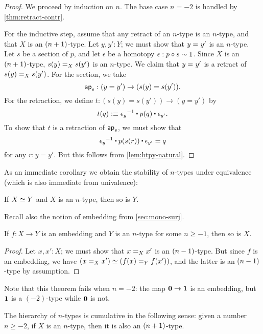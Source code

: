 \begin{proof}
 We proceed by induction on $n$.
 The base case $n=-2$ is handled by \autoref{thm:retract-contr}.

 For the inductive step, assume that any retract of an $n$-type is an $n$-type, and that $X$ is an $\nplusone$-type.
 Let $y, y' : Y$; we must show that $\id{y}{y'}$ is an $n$-type.
 Let $s$ be a section of $p$, and let $\epsilon$ be a homotopy $\epsilon : p \circ s \htpy 1$.
 Since $X$ is an $\nplusone$-type, $\id[X]{s(y)}{s(y')}$ is an $n$-type.
 We claim that $\id{y}{y'}$ is a retract of $\id[X]{s(y)}{s(y')}$.
 For the section, we take
 \[ \apfunc s : (y=y') \to (s(y)=s(y')). \]
 For the retraction, we define $t:(s(y)=s(y'))\to(y=y')$ by
 \[ t(q) \defeq  \opp{\epsilon_y} \ct \ap p q \ct \epsilon_{y'}.\]
 To show that $t$ is a retraction of $\apfunc s$, we must show that
 \[ \opp{\epsilon_y} \ct \ap p {\ap sr} \ct \epsilon_{y'} = q \]
 for any $r:y=y'$.
 But this follows from \autoref{lem:htpy-natural}.
\end{proof}

As an immediate corollary we obtain the stability of $n$-types under equivalence (which is also immediate from univalence):

\begin{cor}\label{cor:preservation-hlevels-weq}
 If $\eqv{X}{Y}$ and $X$ is an $n$-type, then so is $Y$.
\end{cor}

Recall also the notion of embedding from \autoref{sec:mono-surj}.

\begin{thm}\label{thm:isntype-mono}
  If $f:X\to Y$ is an embedding and $Y$ is an $n$-type for some $n\ge -1$, then so is $X$.
\end{thm}
\begin{proof}
  Let $x,x':X$; we must show that $\id[X]{x}{x'}$ is an $\nminusone$-type.
  But since $f$ is an embedding, we have $(\id[X]{x}{x'}) \eqvsym (\id[Y]{f(x)}{f(x')})$, and the latter is an $\nminusone$-type by assumption.
\end{proof}

Note that this theorem fails when $n=-2$: the map $\emptyt \to \unit$ is an embedding, but $\unit$ is a $(-2)$-type while $\emptyt$ is not.

\begin{thm}\label{thm:hlevel-cumulative}
 The hierarchy of $n$-types is cumulative in the following sense:
   given a number $n \geq -2$, if $X$ is an $n$-type, then it is also an $\nplusone$-type.
\end{thm}

